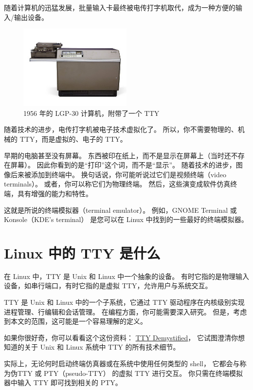 \documentclass{ctexart}
\begin{document}
    随着计算机的迅猛发展，批量输入卡最终被电传打字机取代，成为一种方便的输入/输出设备。

    \begin{figure}[htbp]
        \centering
        \includegraphics[width=0.50\textwidth]{images/LGP-30-early-computer-1956.jpg}
        \caption{1956 年的 LGP-30 计算机，附带了一个 TTY}
    \end{figure}

    随着技术的进步，电传打字机被电子技术虚拟化了。
    所以，你不需要物理的、机械的 TTY，而是虚拟的、电子的 TTY。

    早期的电脑甚至没有屏幕。
    东西被印在纸上，而不是显示在屏幕上（当时还不存在屏幕）。
    因此你看到的是“打印”这个词，而不是“显示”。
    随着技术的进步，图像后来被添加到终端中。
    换句话说，你可能听说过它们是视频终端（video terminals）。
    或者，你可以称它们为物理终端。
    然后，这些演变成软件仿真终端，具有增强的能力和特性。

    这就是所说的终端模拟器（terminal emulator）。
    例如，GNOME Terminal 或 Konsole（KDE’s terminal） 是您可以在 Linux 中找到的一些最好的终端模拟器。

\clearpage
\section{Linux 中的 TTY 是什么}
    在 Linux 中，TTY 是 Unix 和 Linux 中一个抽象的设备。
    有时它指的是物理输入设备，如串行端口，有时它指的是虚拟 TTY，允许用户与系统交互。

    TTY 是 Unix 和 Linux 中的一个子系统，它通过 TTY 驱动程序在内核级别实现进程管理、行编辑和会话管理。
    在编程方面，你可能需要深入研究。
    但是，考虑到本文的范围，这可能是一个容易理解的定义。

    如果你很好奇，你可以看看这个这份资料：
    \href{https://www.linusakesson.net/programming/tty/index.php?ref=itsfoss.com}{TTY Demystified}，
    它试图澄清你想知道的关于 Unix 和 Linux 系统中 TTY 的所有技术细节。

    实际上，无论何时启动终端仿真器或在系统中使用任何类型的 shell，
    它都会与称为伪TTY 或 PTY（pseudo-TTY） 的虚拟 TTY 进行交互。
    你只需在终端模拟器中输入 TTY 即可找到相关的 PTY。
\end{document}
